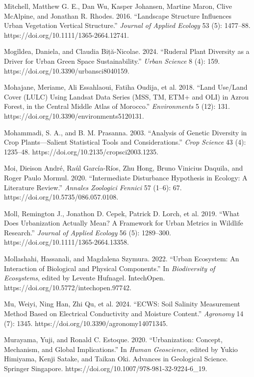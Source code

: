 Mitchell, Matthew G. E., Dan Wu, Kasper Johansen, Martine Maron, Clive McAlpine, and Jonathan R. Rhodes. 2016. ``Landscape Structure Influences Urban Vegetation Vertical Structure.'' \emph{Journal of Applied Ecology} 53 (5): 1477--88. https://doi.org/10.1111/1365-2664.12741.

Mogîldea, Daniela, and Claudia Biță-Nicolae. 2024. ``Ruderal Plant Diversity as a Driver for Urban Green Space Sustainability.'' \emph{Urban Science} 8 (4): 159. https://doi.org/10.3390/urbansci8040159.

Mohajane, Meriame, Ali Essahlaoui, Fatiha Oudija, et al. 2018. ``Land Use/Land Cover (LULC) Using Landsat Data Series (MSS, TM, ETM+ and OLI) in Azrou Forest, in the Central Middle Atlas of Morocco.'' \emph{Environments} 5 (12): 131. https://doi.org/10.3390/environments5120131.

Mohammadi, S. A., and B. M. Prasanna. 2003. ``Analysis of Genetic Diversity in Crop Plants---Salient Statistical Tools and Considerations.'' \emph{Crop Science} 43 (4): 1235--48. https://doi.org/10.2135/cropsci2003.1235.

Moi, Dieison André, Raúl García-Ríos, Zhu Hong, Bruno Vinicius Daquila, and Roger Paulo Mormul. 2020. ``Intermediate Disturbance Hypothesis in Ecology: A Literature Review.'' \emph{Annales Zoologici Fennici} 57 (1--6): 67. https://doi.org/10.5735/086.057.0108.

Moll, Remington J., Jonathon D. Cepek, Patrick D. Lorch, et al. 2019. ``What Does Urbanization Actually Mean? A Framework for Urban Metrics in Wildlife Research.'' \emph{Journal of Applied Ecology} 56 (5): 1289--300. https://doi.org/10.1111/1365-2664.13358.

Mollashahi, Hassanali, and Magdalena Szymura. 2022. ``Urban Ecosystem: An Interaction of Biological and Physical Components.'' In \emph{Biodiversity of Ecosystems}, edited by Levente Hufnagel. IntechOpen. https://doi.org/10.5772/intechopen.97742.

Mu, Weiyi, Ning Han, Zhi Qu, et al. 2024. ``ECWS: Soil Salinity Measurement Method Based on Electrical Conductivity and Moisture Content.'' \emph{Agronomy} 14 (7): 1345. https://doi.org/10.3390/agronomy14071345.

Murayama, Yuji, and Ronald C. Estoque. 2020. ``Urbanization: Concept, Mechanism, and Global Implications.'' In \emph{Human Geoscience}, edited by Yukio Himiyama, Kenji Satake, and Taikan Oki. Advances in Geological Science. Springer Singapore. https://doi.org/10.1007/978-981-32-9224-6\_19.

